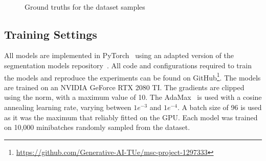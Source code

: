 \begin{figure}
    \centering
    \\
    \caption{\label{fig:coco-samples}Ground truths for the dataset samples}
\end{figure}


\subsection{Training Settings}
All models are implemented in PyTorch~\cite{Ansel_PyTorch_2_Faster_2024} using an adapted version of the segmentation models repository~\cite{Iakubovskii:2019}. All code and configurations required to train the models and reproduce the experiments can be found on GitHub\footnote[1]{\url{https://github.com/Generative-AI-TUe/msc-project-1297333}}. The models are trained on an NVIDIA GeForce RTX 2080 TI. The gradients are clipped using the norm, with a maximum value of 10. The AdaMax~\cite{kingma2017adammethodstochasticoptimization} is used with a cosine annealing learning rate, varying between $1e^{-3}$ and $1e^{-4}$. A batch size of 96 is used as it was the maximum that reliably fitted on the GPU. Each model was trained on 10,000 minibatches randomly sampled from the dataset.

